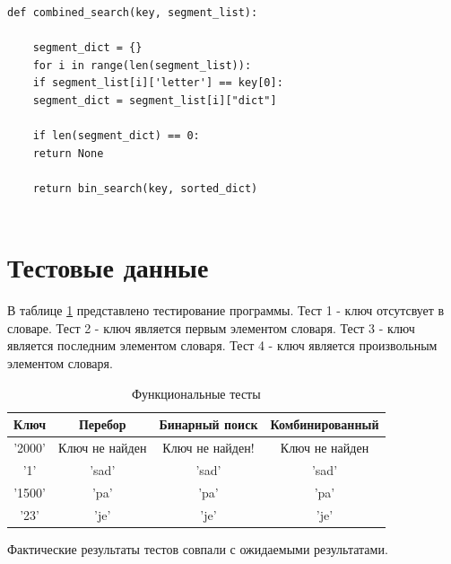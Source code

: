 \documentclass[12pt]{report}
\begin{document}
\begin{lstlisting}[label={lst:conv1},caption=Комбинированный алгоритм.]
	def combined_search(key, segment_list):
	
	segment_dict = {}
	for i in range(len(segment_list)):
	if segment_list[i]['letter'] == key[0]:
	segment_dict = segment_list[i]["dict"]
	
	if len(segment_dict) == 0:
	return None
	
	return bin_search(key, sorted_dict)
	
\end{lstlisting}

\newpage

\section{Тестовые данные}

В таблице \ref{tab:tests} представлено тестирование программы.
\newline Тест 1 - ключ отсутсвует в словаре.
\newline Тест 2 - ключ является первым элементом словаря.
\newline Тест 3 - ключ является последним элементом словаря.
\newline Тест 4 - ключ является произвольным элементом словаря.

\begin{table}[h]
	\caption{\label{tab:tests}Функциональные тесты}
	\begin{center}
		\begin{tabular}{ | c | c | c | c |}
			\hline
			\textbf{Ключ} & \textbf{Перебор} & \textbf{Бинарный поиск} & \textbf{Комбинированный}\\ \hline
			'2000' &
			Ключ не найден & 
			Ключ не найден! &
			Ключ не найден \\
			\hline
			
			'1' & 
			{'sad'} &
			{'sad'} &
			{'sad'}  \\
			\hline
			
			'1500' &
			{'pa'} &
			{'pa'} &
			{'pa'} \\
			\hline
			
			'23' &
			{'je'} &
			{'je'} &
			{'je'} \\
			\hline
		\end{tabular}
		
	\end{center}
\end{table} 


Фактические результаты тестов совпали с ожидаемыми результатами.
\end{document}
